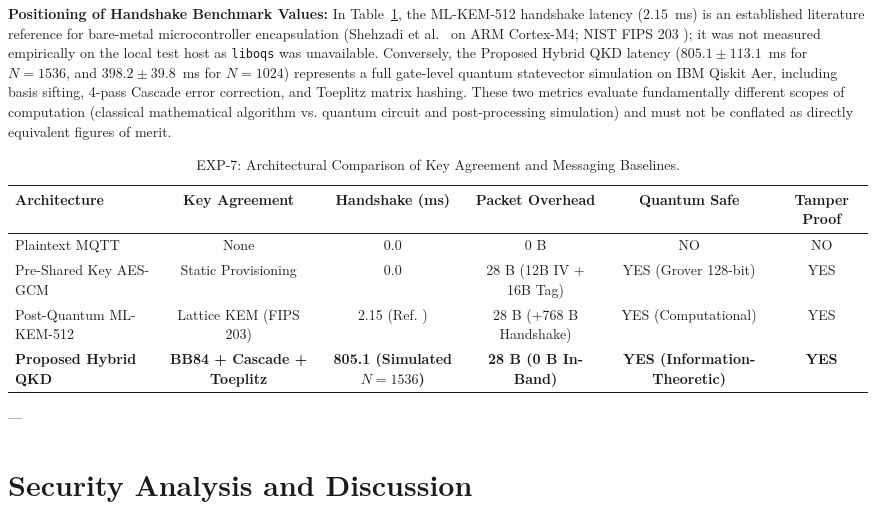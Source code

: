\documentclass[journal,10pt,twocolumn]{article}
\begin{document}
\textbf{Positioning of Handshake Benchmark Values:} In Table~\ref{tab:exp7}, the ML-KEM-512 handshake latency ($2.15$~ms) is an established literature reference for bare-metal microcontroller encapsulation (Shehzadi et al.\ \cite{shehzadi2025kyber} on ARM Cortex-M4; NIST FIPS 203 \cite{nist2024fips203}); it was not measured empirically on the local test host as \texttt{liboqs} was unavailable. Conversely, the Proposed Hybrid QKD latency ($805.1 \pm 113.1$~ms for $N=1536$, and $398.2 \pm 39.8$~ms for $N=1024$) represents a full gate-level quantum statevector simulation on IBM Qiskit Aer, including basis sifting, 4-pass Cascade error correction, and Toeplitz matrix hashing. These two metrics evaluate fundamentally different scopes of computation (classical mathematical algorithm vs. quantum circuit and post-processing simulation) and must not be conflated as directly equivalent figures of merit.

\begin{table}[t]
\caption{EXP-7: Architectural Comparison of Key Agreement and Messaging Baselines.}
\centering
\small
\begin{tabular}{lccccc}
\toprule
\textbf{Architecture} & \textbf{Key Agreement} & \textbf{Handshake (ms)} & \textbf{Packet Overhead} & \textbf{Quantum Safe} & \textbf{Tamper Proof} \\
\midrule
Plaintext MQTT & None & 0.0 & 0 B & NO & NO \\
Pre-Shared Key AES-GCM & Static Provisioning & 0.0 & 28 B (12B IV + 16B Tag) & YES (Grover 128-bit) & YES \\
Post-Quantum ML-KEM-512 & Lattice KEM (FIPS 203) & 2.15 (Ref. \cite{shehzadi2025kyber}) & 28 B (+768 B Handshake) & YES (Computational) & YES \\
\textbf{Proposed Hybrid QKD} & \textbf{BB84 + Cascade + Toeplitz} & \textbf{805.1 (Simulated $N=1536$)} & \textbf{28 B (0 B In-Band)} & \textbf{YES (Information-Theoretic)} & \textbf{YES} \\
\bottomrule
\end{tabular}
\label{tab:exp7}
\end{table}

---

\section{Security Analysis and Discussion}
\end{document}
